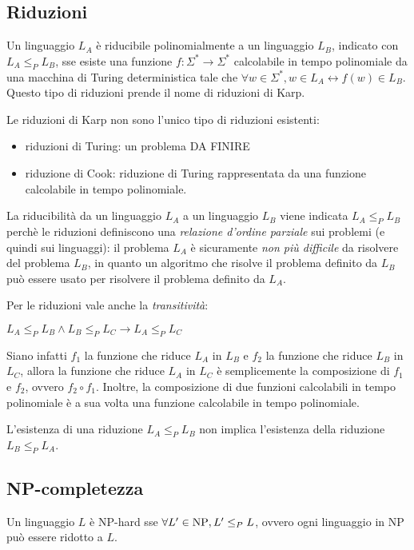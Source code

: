 \subsection*{Riduzioni}
\begin{defn}
    Un linguaggio $L_A$ è riducibile polinomialmente a un linguaggio $L_B$, indicato con $L_A \le_{P} L_B$, sse esiste una funzione $f: \Sigma^* \rightarrow \Sigma^*$ calcolabile in tempo polinomiale da una macchina di Turing deterministica tale che $\forall w \in \Sigma^*, w \in L_A \leftrightarrow f(w) \in L_B$. Questo tipo di riduzioni prende il nome di riduzioni di Karp.
\end{defn}
Le riduzioni di Karp non sono l'unico tipo di riduzioni esistenti:
\begin{itemize}
    \item riduzioni di Turing: un problema DA FINIRE
    \item riduzione di Cook: riduzione di Turing rappresentata da una funzione calcolabile in tempo polinomiale.
\end{itemize}
La riducibilità da un linguaggio $L_A$ a un linguaggio $L_B$ viene indicata $L_A \le_{P} L_B$ perchè le riduzioni definiscono una \textit{relazione d'ordine parziale} sui problemi (e quindi sui linguaggi): il problema $L_A$ è sicuramente \textit{non più difficile} da risolvere del problema $L_B$, in quanto un algoritmo che risolve il problema definito da $L_B$ può essere usato per risolvere il problema definito da $L_A$.

Per le riduzioni vale anche la \textit{transitività}:
\begin{center}
    $L_A \le_P L_B \land L_B \le_P L_C \rightarrow L_A \le_P L_C$
\end{center}
Siano infatti $f_1$ la funzione che riduce $L_A$ in $L_B$ e $f_2$ la funzione che riduce $L_B$ in $L_C$, allora la funzione che riduce $L_A$ in $L_C$ è semplicemente la composizione di $f_1$ e $f_2$, ovvero $f_2 \circ f_1$. Inoltre, la composizione di due funzioni calcolabili in tempo polinomiale è a sua volta una funzione calcolabile in tempo polinomiale.

\begin{rem}
    L'esistenza di una riduzione $L_A \le_P L_B$ non implica l'esistenza della riduzione $L_B \le_P L_A$.
\end{rem}

\subsection*{NP-completezza}
\begin{defn}
    Un linguaggio $L$ è NP-hard sse $\forall L' \in \textnormal{NP}, L' \le_P L$, ovvero ogni linguaggio in NP può essere ridotto a $L$.
\end{defn}

